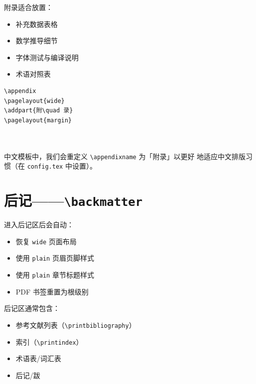 附录适合放置：
\begin{itemize}
    \item 补充数据表格
    \item 数学推导细节
    \item 字体测试与编译说明
    \item 术语对照表
\end{itemize}

\begin{lstlisting}
\appendix
\pagelayout{wide}
\addpart{附\quad 录}
\pagelayout{margin}



\end{lstlisting}

\begin{kaobox}[title=注意事项]
中文模板中，我们会重定义 \lstinline|\appendixname| 为「附\quad 录」以更好
地适应中文排版习惯（在 \texttt{config.tex} 中设置）。
\end{kaobox}


\section{后记——\texttt{\textbackslash backmatter}}


进入后记区后会自动：
\begin{itemize}
    \item 恢复 \texttt{wide} 页面布局
    \item 使用 \texttt{plain} 页眉页脚样式
    \item 使用 \texttt{plain} 章节标题样式
    \item PDF 书签重置为根级别
\end{itemize}

后记区通常包含：
\begin{itemize}
    \item 参考文献列表（\lstinline|\printbibliography|）
    \item 索引（\lstinline|\printindex|）
    \item 术语表/词汇表
    \item 后记/跋
\end{itemize}


